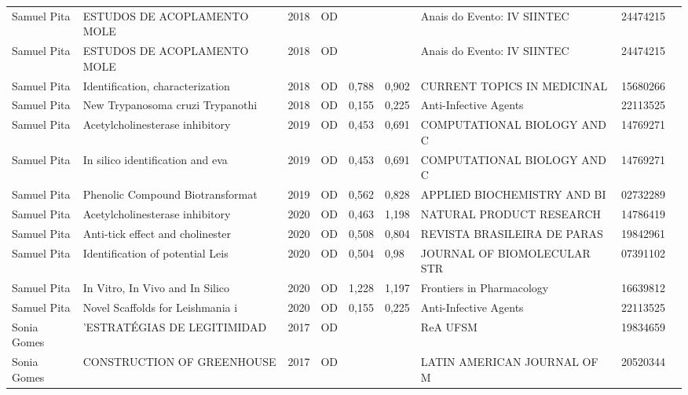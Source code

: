 \documentclass[12pt,brazil]{article}\usepackage[]{graphicx}\usepackage[]{xcolor}
\begin{document}
\begin{longtable}{lllrrllrr}
Samuel Pita & ESTUDOS DE ACOPLAMENTO MOLE & 2018 & OD &  &  & Anais do Evento: IV SIINTEC & 24474215 \\
\rowcolor{duplic}\rowcolor{duplic}\rowcolor{duplic}\rowcolor{duplic}\rowcolor{duplic}\rowcolor{duplic}\rowcolor{duplic}\rowcolor{duplic}\rowcolor{duplic}\rowcolor{duplic}\rowcolor{duplic}\rowcolor{duplic}\rowcolor{duplic}\rowcolor{duplic}\rowcolor{duplic}\rowcolor{duplic}Samuel Pita & ESTUDOS DE ACOPLAMENTO MOLE & 2018 & OD &  &  & Anais do Evento: IV SIINTEC & 24474215 \\
Samuel Pita & Identification, characterization & 2018 & OD & 0,788 & 0,902 & CURRENT TOPICS IN MEDICINAL & 15680266 \\
Samuel Pita & New Trypanosoma cruzi Trypanothi & 2018 & OD & 0,155 & 0,225 & Anti-Infective Agents & 22113525 \\
Samuel Pita & Acetylcholinesterase inhibitory  & 2019 & OD & 0,453 & 0,691 & COMPUTATIONAL BIOLOGY AND C & 14769271 \\
Samuel Pita & In silico identification and eva & 2019 & OD & 0,453 & 0,691 & COMPUTATIONAL BIOLOGY AND C & 14769271 \\
Samuel Pita & Phenolic Compound Biotransformat & 2019 & OD & 0,562 & 0,828 & APPLIED BIOCHEMISTRY AND BI & 02732289 \\
\rowcolor{duplic}\rowcolor{duplic}\rowcolor{duplic}\rowcolor{duplic}\rowcolor{duplic}\rowcolor{duplic}\rowcolor{duplic}\rowcolor{duplic}\rowcolor{duplic}\rowcolor{duplic}\rowcolor{duplic}\rowcolor{duplic}\rowcolor{duplic}\rowcolor{duplic}\rowcolor{duplic}\rowcolor{duplic}Samuel Pita & Acetylcholinesterase inhibitory  & 2020 & OD & 0,463 & 1,198 & NATURAL PRODUCT RESEARCH & 14786419 \\
Samuel Pita & Anti-tick effect and cholinester & 2020 & OD & 0,508 & 0,804 & REVISTA BRASILEIRA DE PARAS & 19842961 \\
Samuel Pita & Identification of potential Leis & 2020 & OD & 0,504 & 0,98 & JOURNAL OF BIOMOLECULAR STR & 07391102 \\
Samuel Pita & In Vitro, In Vivo and In Silico  & 2020 & OD & 1,228 & 1,197 & Frontiers in Pharmacology & 16639812 \\
Samuel Pita & Novel Scaffolds for Leishmania i & 2020 & OD & 0,155 & 0,225 & Anti-Infective Agents & 22113525 \\
Sonia Gomes & ’ESTRATÉGIAS DE LEGITIMIDAD & 2017 & OD &  &  & ReA UFSM & 19834659 \\
Sonia Gomes & CONSTRUCTION OF GREENHOUSE  & 2017 & OD &  &  & LATIN AMERICAN JOURNAL OF M & 20520344 \\

\end{longtable}
\end{document}
